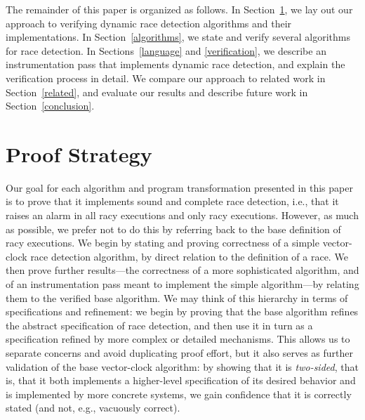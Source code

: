 \documentclass[preprint, 10pt]{sigplanconf}
\begin{document}
The remainder of this paper is organized as follows. In Section~\ref{strategy}, we lay out our approach to verifying dynamic race detection algorithms and their implementations. In Section~\ref{algorithms}, we state and verify several algorithms for race detection. In Sections~\ref{language} and \ref{verification}, we describe an instrumentation pass that implements dynamic race detection, and explain the verification process in detail. We compare our approach to related work in Section~\ref{related}, and evaluate our results and describe future work in Section~\ref{conclusion}.

\section{Proof Strategy}
\label{strategy}
Our goal for each algorithm and program transformation presented in this paper is to prove that it implements sound and complete race detection, i.e., that it raises an alarm in all racy executions and only racy executions. However, as much as possible, we prefer not to do this by referring back to the base definition of racy executions. We begin by stating and proving correctness of a simple vector-clock race detection algorithm, by direct relation to the definition of a race. We then prove further results---the correctness of a more sophisticated algorithm, and of an instrumentation pass meant to implement the simple algorithm---by relating them to the verified base algorithm. We may think of this hierarchy in terms of specifications and refinement: we begin by proving that the base algorithm refines the abstract specification of race detection, and then use it in turn as a specification refined by more complex or detailed mechanisms. This allows us to separate concerns and avoid duplicating proof effort, but it also serves as further validation of the base vector-clock algorithm: by showing that it is \emph{two-sided}, that is, that it both implements a higher-level specification of its desired behavior and is implemented by more concrete systems, we gain confidence that it is correctly stated (and not, e.g., vacuously correct).
\end{document}
